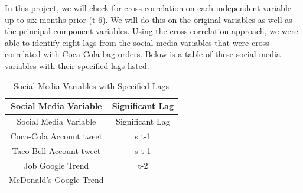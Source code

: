 \documentclass[12pt,oneside]{chicagocapstone}
\begin{document}
In this project, we will check for cross correlation on each independent
variable up to six months prior (t-6). We will do this on the original
variables as well as the principal component variables. Using the cross
correlation approach, we were able to identify eight lags from the
social media variables that were cross correlated with Coca-Cola bag
orders. Below is a table of these social media variables with their
specified lags listed.
\begin{longtable}[]{@{}cc@{}}
\caption{\label{tab:inher} Social Media Variables with Specified
Lags}\tabularnewline
\toprule
\begin{minipage}[b]{0.34\columnwidth}\centering\strut
Social Media Variable\strut
\end{minipage} & \begin{minipage}[b]{0.43\columnwidth}\centering\strut
Significant Lag\strut
\end{minipage}\tabularnewline
\midrule
\endfirsthead
\toprule
\begin{minipage}[b]{0.34\columnwidth}\centering\strut
Social Media Variable\strut
\end{minipage} & \begin{minipage}[b]{0.43\columnwidth}\centering\strut
Significant Lag\strut
\end{minipage}\tabularnewline
\midrule
\endhead
\begin{minipage}[t]{0.34\columnwidth}\centering\strut
Coca-Cola Account tweet\strut
\end{minipage} & \begin{minipage}[t]{0.43\columnwidth}\centering\strut
s t-1\strut
\end{minipage}\tabularnewline
\begin{minipage}[t]{0.34\columnwidth}\centering\strut
Taco Bell Account tweet\strut
\end{minipage} & \begin{minipage}[t]{0.43\columnwidth}\centering\strut
s t-1\strut
\end{minipage}\tabularnewline
\begin{minipage}[t]{0.34\columnwidth}\centering\strut
Job Google Trend\strut
\end{minipage} & \begin{minipage}[t]{0.43\columnwidth}\centering\strut
t-2\strut
\end{minipage}\tabularnewline
\begin{minipage}[t]{0.34\columnwidth}\centering\strut
McDonald's Google Trend\strut
\end{minipage} & \begin{minipage}[t]{0.43\columnwidth}\centering\strut

\end{minipage}
\end{longtable}
\end{document}
